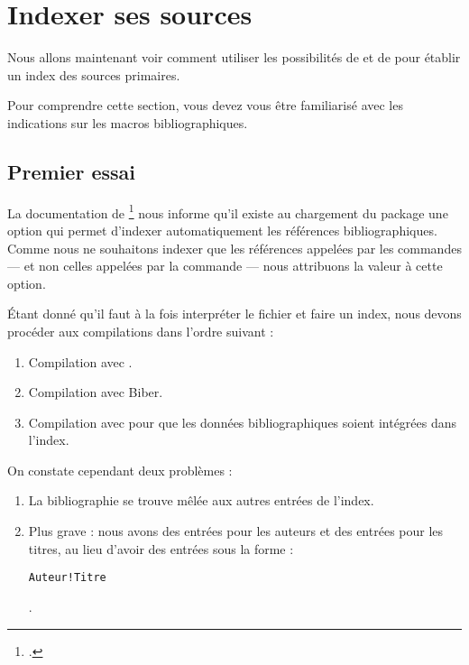 \section{Indexer ses sources}

Nous allons maintenant voir comment utiliser les possibilités de  et de  pour établir un index des sources primaires.

Pour comprendre cette section, vous devez vous être familiarisé avec les indications sur les macros bibliographiques.



\subsection{Premier essai}

La documentation de \footcite{biblatex_options} nous informe qu'il existe  au chargement du package une option  qui permet d'indexer automatiquement les références bibliographiques. Comme nous ne souhaitons indexer que les références appelées par les commandes   ---  et non celles appelées par la commande  --- nous attribuons la valeur  à cette option. 

\begin{latexcode}
\usepackage[indexing=cite]{biblatex}
\end{latexcode}

Étant donné qu'il faut à la fois interpréter le fichier  et faire un index, nous devons procéder aux compilations dans l'ordre suivant :

\begin{enumerate}
\item Compilation avec \XeLaTeX.
\item Compilation avec Biber.
\item Compilation avec \XeLaTeX pour que les données bibliographiques soient intégrées dans l'index.
\end{enumerate}

On constate cependant deux problèmes : 
\begin{enumerate}
\item La bibliographie se trouve mêlée aux autres entrées de l'index.
\item Plus grave : nous avons des entrées pour les auteurs et des entrées pour les titres, au lieu d'avoir des entrées sous la forme : 
\begin{english}\verb|Auteur!Titre|\end{english}.
\end{enumerate}

